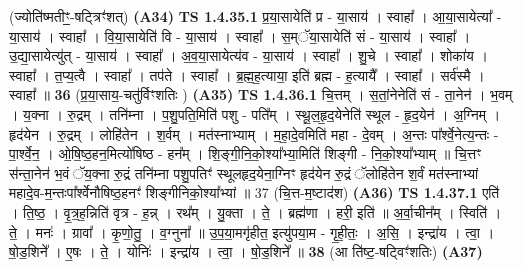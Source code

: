 \documentclass[17pt]{extarticle}
\begin{document}
                  \newline
                      (ज्योति॑ष्मतीꣳ॒॒-षट्त्रिꣳ॑शत्)  \textbf{(A34)} \newline \newline
                                \textbf{ TS 1.4.35.1} \newline
                  प्र॒या॒सायेति॑ प्र - या॒साय॑ । स्वाहा᳚ । आ॒या॒सायेत्या᳚ - या॒साय॑ । स्वाहा᳚ । वि॒या॒सायेति॑ वि - या॒साय॑ । स्वाहा᳚ । स॒म्ॅया॒सायेति॑ सं - या॒साय॑ । स्वाहा᳚ । उ॒द्या॒सायेत्यु॑त् - या॒साय॑ । स्वाहा᳚ । अ॒व॒या॒सायेत्य॑व - या॒साय॑ । स्वाहा᳚ । शु॒चे । स्वाहा᳚ । शोका॑य । स्वाहा᳚ । त॒प्य॒त्वै । स्वाहा᳚ । तप॑ते । स्वाहा᳚ । ब्र॒ह्म॒ह॒त्याया॒ इति॑ ब्रह्म - ह॒त्यायै᳚ । स्वाहा᳚ । सर्व॑स्मै । स्वाहा᳚ ॥ \textbf{  36 } \newline
                  \newline
                      (प्र॒या॒साय॒-चतु॑र्विꣳशतिः )  \textbf{(A35)} \newline \newline
                                \textbf{ TS 1.4.36.1} \newline
                  चि॒त्तम् । स॒तां॒नेनेति॑ सं - ता॒नेन॑ । भ॒वम् । य॒क्ना । रु॒द्रम् । तनि॑म्ना । प॒शु॒पति॒मिति॑ पशु - पति᳚म् । स्थू॒ल॒हृ॒द॒येनेति॑ स्थूल - हृ॒द॒येन॑ । अ॒ग्निम् । हृद॑येन । रु॒द्रम् । लोहि॑तेन । श॒र्वम् । मत॑स्नाभ्याम् । म॒हा॒दे॒वमिति॑ महा - दे॒वम् । अ॒न्तः पा᳚र्श्वे॒नेत्य॒न्तः - पा॒र्श्वे॒न॒ । ओ॒षि॒ष्ठ॒हन॒मित्यो॑षिष्ठ - हन᳚म् । शि॒ङ्गी॒नि॒को॒श्या᳚भ्या॒मिति॑ शिङ्गी - नि॒को॒श्या᳚भ्याम् ॥ \textbf{ } \newline
                  \newline
                      चि॒त्तꣳ स॑न्ता॒नेन॑ भ॒वं ॅय॒क्ना रु॒द्रं तनि॑म्ना पशु॒पतिꣳ॑ स्थूलहृद॒येना॒ग्निꣳ हृद॑येन रु॒द्रं ॅलोहि॑तेन श॒र्वं मत॑स्नाभ्यां महादे॒व-म॒न्तःपा᳚र्श्वेनौषिष्ठ॒हनꣳ॑ शिङ्गीनिको॒श्या᳚भ्यां ॥ 37 (चि॒त्त-म॒ष्टाद॑श)  \textbf{(A36)} \newline \newline
                                \textbf{ TS 1.4.37.1} \newline
                  एति॑ । ति॒ष्ठ॒ । वृ॒त्र॒ह॒न्निति॑ वृत्र - ह॒न्न् । रथ᳚म् । यु॒क्ता । ते॒ । ब्रह्म॑णा । हरी॒ इति॑ ॥ अ॒र्वा॒चीन᳚म् । स्विति॑ । ते॒ । मनः॑ । ग्रावा᳚ । कृ॒णो॒तु॒ । व॒ग्नुना᳚ ॥ उ॒प॒या॒मगृ॑हीत॒ इत्यु॑पया॒म - गृ॒ही॒तः॒ । अ॒सि॒ । इन्द्रा॑य । त्वा॒ । षो॒ड॒शिने᳚ । ए॒षः । ते॒ । योनिः॑ । इन्द्रा॑य । त्वा॒ । षो॒ड॒शिने᳚ ॥ \textbf{  38} \newline
                  \newline
                      (आ ति॑ष्ट॒-षट्विꣳ॑शतिः)  \textbf{(A37)} \newline \newline
\end{document}
